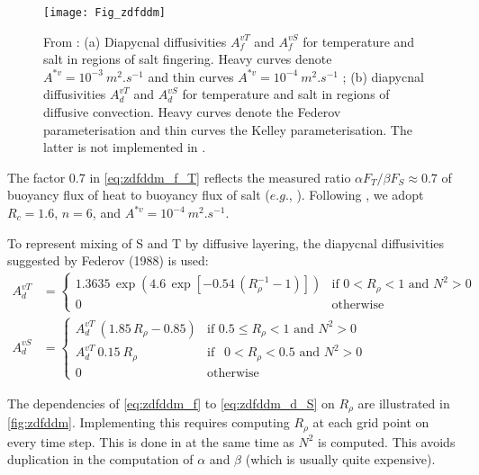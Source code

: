 \documentclass[../tex_main/NEMO_manual]{subfiles}
\begin{document}
\begin{figure}[!t]   \begin{center}
\texttt{[image: Fig\_zdfddm]}
\caption{  \protect\label{fig:zdfddm}
From \citet{Merryfield1999} : (a) Diapycnal diffusivities $A_f^{vT}$ 
and $A_f^{vS}$ for temperature and salt in regions of salt fingering. Heavy 
curves denote $A^{\ast v} = 10^{-3}~m^2.s^{-1}$ and thin curves 
$A^{\ast v} = 10^{-4}~m^2.s^{-1}$ ; (b) diapycnal diffusivities $A_d^{vT}$ and 
$A_d^{vS}$ for temperature and salt in regions of diffusive convection. Heavy 
curves denote the Federov parameterisation and thin curves the Kelley 
parameterisation. The latter is not implemented in \NEMO. }
\end{center}    \end{figure}

The factor 0.7 in \autoref{eq:zdfddm_f_T} reflects the measured ratio 
$\alpha F_T /\beta F_S \approx  0.7$ of buoyancy flux of heat to buoyancy 
flux of salt ($e.g.$, \citet{McDougall_Taylor_JMR84}). Following  \citet{Merryfield1999}, 
we adopt $R_c = 1.6$, $n = 6$, and $A^{\ast v} = 10^{-4}~m^2.s^{-1}$.

To represent mixing of S and T by diffusive layering,  the diapycnal diffusivities suggested by Federov (1988) is used: 
\begin{align} 	\label{eq:zdfddm_d}
A_d^{vT} &= 	\begin{cases}
	1.3635 \, \exp{\left( 4.6\, \exp{ \left[  -0.54\,( R_{\rho}^{-1} - 1 )  \right] }    \right)}
									&\text{if  $0<R_\rho < 1$ and $N^2>0$ } \\
	0 								&\text{otherwise} 
				\end{cases}   
\\   			\label{eq:zdfddm_d_S}
A_d^{vS} &= 	\begin{cases}
	A_d^{vT}\ \left( 1.85\,R_{\rho} - 0.85 \right)
									&\text{if  $0.5 \leq R_\rho<1$ and $N^2>0$ } \\
	A_d^{vT} \ 0.15 \ R_\rho
									&\text{if  $\ \ 0 < R_\rho<0.5$ and $N^2>0$ } \\
	0 								&\text{otherwise} 
				\end{cases}   
\end{align}

The dependencies of \autoref{eq:zdfddm_f} to \autoref{eq:zdfddm_d_S} on $R_\rho$ 
are illustrated in \autoref{fig:zdfddm}. Implementing this requires computing 
$R_\rho$ at each grid point on every time step. This is done in  at the 
same time as $N^2$ is computed. This avoids duplication in the computation of 
$\alpha$ and $\beta$ (which is usually quite expensive).
\end{document}
